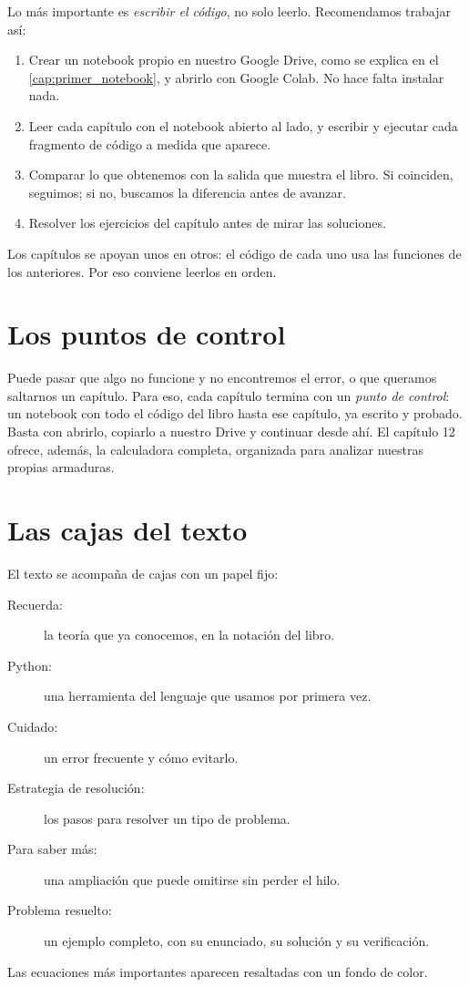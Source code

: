 Lo más importante es \emph{escribir el código}, no solo leerlo. Recomendamos
trabajar así:
\begin{enumerate}
  \item Crear un notebook propio en nuestro Google Drive, como se explica en
    el \cref{cap:primer_notebook}, y abrirlo con Google Colab. No hace falta
    instalar nada.
  \item Leer cada capítulo con el notebook abierto al lado, y escribir y
    ejecutar cada fragmento de código a medida que aparece.
  \item Comparar lo que obtenemos con la salida que muestra el libro. Si
    coinciden, seguimos; si no, buscamos la diferencia antes de avanzar.
  \item Resolver los ejercicios del capítulo antes de mirar las soluciones.
\end{enumerate}
Los capítulos se apoyan unos en otros: el código de cada uno usa las
funciones de los anteriores. Por eso conviene leerlos en orden.

\section*{Los puntos de control}

Puede pasar que algo no funcione y no encontremos el error, o que queramos
saltarnos un capítulo. Para eso, cada capítulo termina con un \emph{punto de
control}: un notebook con todo el código del libro hasta ese capítulo, ya
escrito y probado. Basta con abrirlo, copiarlo a nuestro Drive y continuar
desde ahí. El capítulo 12 ofrece, además, la calculadora completa, organizada
para analizar nuestras propias armaduras.

\section*{Las cajas del texto}

El texto se acompaña de cajas con un papel fijo:
\begin{description}
  \item[Recuerda:] la teoría que ya conocemos, en la notación del libro.
  \item[Python:] una herramienta del lenguaje que usamos por primera vez.
  \item[Cuidado:] un error frecuente y cómo evitarlo.
  \item[Estrategia de resolución:] los pasos para resolver un tipo de
    problema.
  \item[Para saber más:] una ampliación que puede omitirse sin perder el hilo.
  \item[Problema resuelto:] un ejemplo completo, con su enunciado, su
    solución y su verificación.
\end{description}
Las ecuaciones más importantes aparecen resaltadas con un fondo de color.

